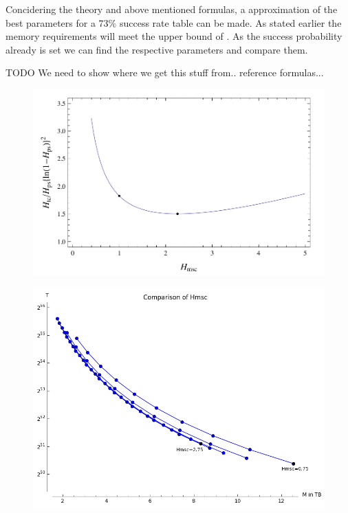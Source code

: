 Concidering the theory and above mentioned formulas, a approximation of the best parameters for a $73\%$ success rate table can be made.
As stated earlier the memory requirements will meet the upper bound of
.
As the success probability already is set we can find the respective parameters and compare them.

TODO We need to show where we get this stuff from.. reference
formulas...
\begin{figure}[H]
  \centering
  \begin{minipage}{0.45\textwidth}
    \centering
    \includegraphics[width=1.2\textwidth]{figures/HellmanTradeOff.png}
    \label{fig:hellTC}
  \end{minipage}\hfill
  \begin{minipage}{0.45\textwidth}
    \centering
    \includegraphics[width=1.2\textwidth]{figures/compareHmsc.png}
    \label{fig:hellHmsc}
  \end{minipage}
\end{figure}
